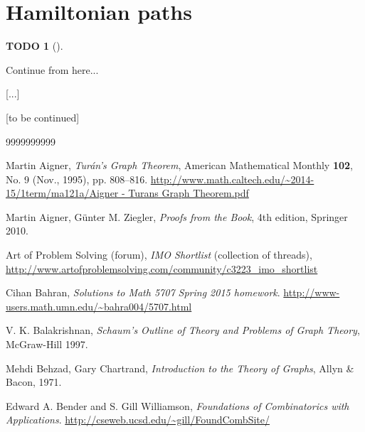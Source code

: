 \documentclass[numbers=enddot,12pt,final,onecolumn,notitlepage]{scrartcl}%
\theoremstyle{definition}
\newtheorem{quest}[theo]{TODO}
\newenvironment{todo}[1][]
{\begin{quest}[#1]\begin{leftbar}}
{\end{leftbar}\end{quest}}
\begin{document}
\section{\label{sect.hamilton}Hamiltonian paths}

\begin{todo}
Continue from here...
\end{todo}

[...]

[to be continued]

\begin{thebibliography}{9999999999}                                                                                       %

Martin Aigner,
\textit{Tur\'an's Graph Theorem}, American Mathematical Monthly
\textbf{102}, No. 9 (Nov., 1995), pp. 808--816. \newline
\url{http://www.math.caltech.edu/~2014-15/1term/ma121a/Aigner - Turans Graph Theorem.pdf}

Martin Aigner, G\"{u}nter M. Ziegler,
\textit{Proofs from the Book}, 4th edition, Springer 2010.

Art of Problem Solving (forum),
\textit{IMO Shortlist} (collection of threads),
\newline
\url{http://www.artofproblemsolving.com/community/c3223_imo_shortlist}


Cihan Bahran,
\textit{Solutions to Math 5707 Spring 2015 homework}.
\newline \url{http://www-users.math.umn.edu/~bahra004/5707.html}

V. K. Balakrishnan,
\textit{Schaum's Outline of Theory and Problems of Graph Theory},
McGraw-Hill 1997.


Mehdi Behzad, Gary Chartrand,
\textit{Introduction to the Theory of Graphs},
Allyn \& Bacon, 1971.

Edward A. Bender and S. Gill Williamson,
\textit{Foundations of Combinatorics with Applications}.
\newline \url{http://cseweb.ucsd.edu/~gill/FoundCombSite/}


\end{thebibliography}
\end{document}
